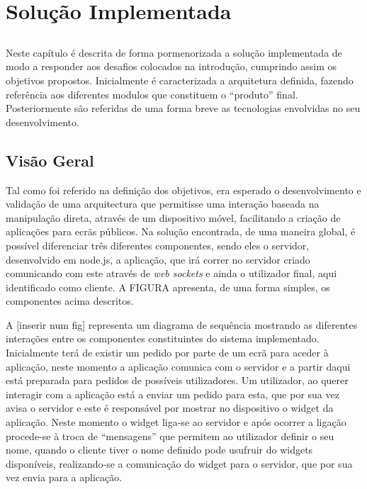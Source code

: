 \chapter{Solução Implementada} \label{chap:sol}

\section*{}

Neste capítulo é descrita de forma pormenorizada a solução implementada de modo a responder aos desafios colocados na introdução, cumprindo assim os objetivos propostos.
Inicialmente é caracterizada a arquitetura definida, fazendo referência aos diferentes modulos que constituem o “produto” final. Posteriormente são referidas de uma forma breve as tecnologias envolvidas no seu desenvolvimento.


\section{Visão Geral} \label{sec:geral}

Tal como foi referido na definição dos objetivos, era esperado o desenvolvimento e validação de uma arquitectura que permitisse uma interação baseada na manipulação direta, através de um dispositivo móvel, facilitando a criação de aplicações para ecrãs públicos.  
Na solução encontrada, de uma maneira global, é possível diferenciar três diferentes componentes, sendo eles o servidor, desenvolvido em node.js, a aplicação, que irá correr no servidor criado comunicando com este através de \textit{web sockets} e ainda o utilizador final, aqui identificado como cliente.
A FIGURA apresenta, de uma forma simples, os componentes acima descritos.

A [inserir num fig] representa um diagrama de sequência mostrando as diferentes interações entre os componentes constituintes do sistema implementado. Inicialmente terá de existir um pedido por parte de um ecrã para aceder à aplicação, neste momento a aplicação comunica com o servidor e a partir daqui está preparada para pedidos de possíveis utilizadores. Um utilizador, ao querer interagir com a aplicação está a enviar um pedido para esta, que por sua vez avisa o servidor e este é responsável por mostrar no dispositivo o widget da aplicação. Neste momento o widget liga-se ao servidor e após ocorrer a ligação procede-se à troca de “mensagens” que permitem ao utilizador definir o seu nome, quando o cliente tiver o nome definido pode usufruir do widgets disponíveis, realizando-se a comunicação do  widget para o servidor, que por sua vez envia para a aplicação.



